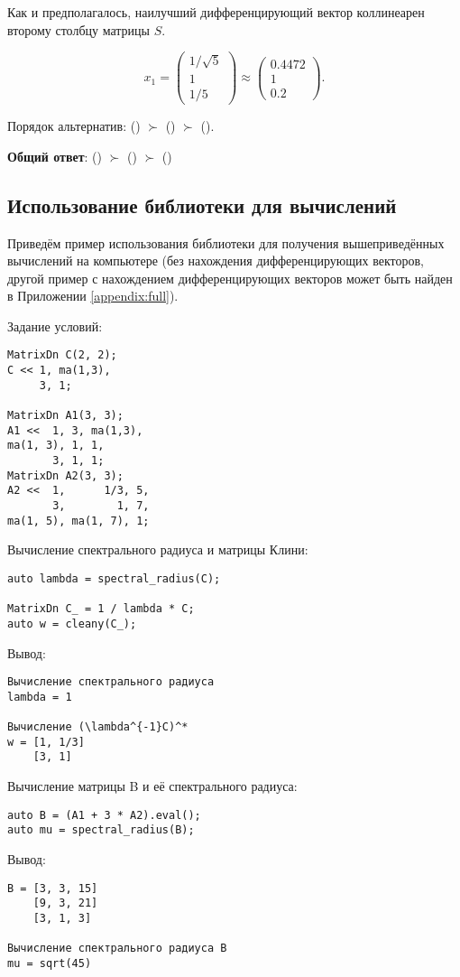\documentclass[specialist,
  substylefile = spbu.rtx,
  href,
  colorlinks=true,
  12pt]{disser}
\begin{document}
	Как и предполагалось, наилучший дифференцирующий вектор коллинеарен второму столбцу матрицы \(S\).
	
	\[
	x_1 = \begin{pmatrix}
		1/\sqrt{5}\\1\\1/5
	\end{pmatrix} \approx \begin{pmatrix}
		0.4472 \\ 1 \\ 0.2
	\end{pmatrix}.
	\]
	
	Порядок альтернатив: () \(\succ\) () \(\succ\) ().
	
	\textbf{Общий ответ}: () \(\succ\) () \(\succ\) ()
	
	\subsection{Использование библиотеки для вычислений}
	Приведём пример использования библиотеки для получения вышеприведённых вычислений на компьютере (без нахождения дифференцирующих векторов, другой пример с нахождением дифференцирующих векторов может быть найден в Приложении \ref{appendix:full}).

Задание условий:
\begin{verbatim}
MatrixDn C(2, 2);
C << 1, ma(1,3), 
     3, 1;
		
MatrixDn A1(3, 3);
A1 <<  1, 3, ma(1,3), 
ma(1, 3), 1, 1, 
       3, 1, 1;
MatrixDn A2(3, 3);
A2 <<  1,      1/3, 5, 
       3,        1, 7, 
ma(1, 5), ma(1, 7), 1;
\end{verbatim}

Вычисление спектрального радиуса и матрицы Клини:
\begin{verbatim}
auto lambda = spectral_radius(C);

MatrixDn C_ = 1 / lambda * C;
auto w = cleany(C_);
\end{verbatim}
Вывод:
\begin{verbatim}
Вычисление спектрального радиуса
lambda = 1

Вычисление (\lambda^{-1}C)^*
w = [1, 1/3]
	[3, 1]
\end{verbatim}

Вычисление матрицы B и её спектрального радиуса:
\begin{verbatim}
auto B = (A1 + 3 * A2).eval();
auto mu = spectral_radius(B);
\end{verbatim}
Вывод:
\begin{verbatim}
B = [3, 3, 15]
	[9, 3, 21]
	[3, 1, 3]

Вычисление спектрального радиуса B
mu = sqrt(45)
\end{verbatim}
\end{document}
